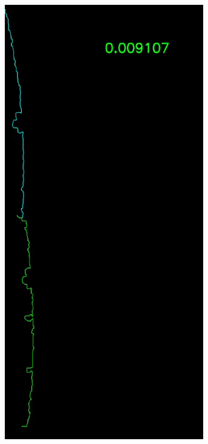 \begin{figure}[h]
    \centering
    \begin{minipage}{0.24\textwidth}
        \centering
        \includegraphics[width=\textwidth]{images/stitching_beginn.PNG} %

\end{minipage}
\end{figure}
